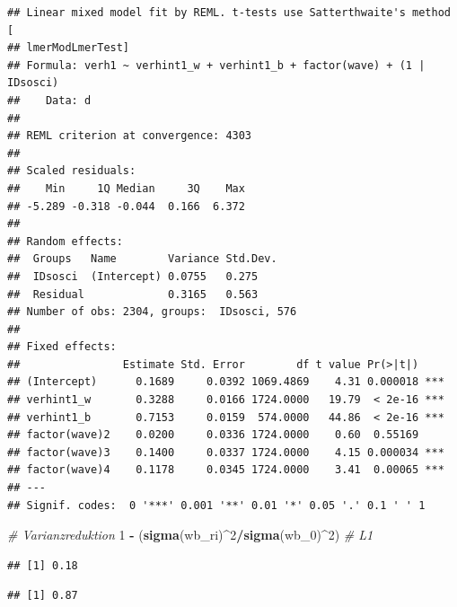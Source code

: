 \documentclass[
]{book}
\newenvironment{Shaded}{\begin{snugshade}}{\end{snugshade}}
\newcommand{\CommentTok}[1]{\textcolor[rgb]{0.56,0.35,0.01}{\textit{#1}}}
\newcommand{\DecValTok}[1]{\textcolor[rgb]{0.00,0.00,0.81}{#1}}
\newcommand{\KeywordTok}[1]{\textcolor[rgb]{0.13,0.29,0.53}{\textbf{#1}}}
\newcommand{\NormalTok}[1]{#1}
\newcommand{\OperatorTok}[1]{\textcolor[rgb]{0.81,0.36,0.00}{\textbf{#1}}}
\newcommand{\StringTok}[1]{\textcolor[rgb]{0.31,0.60,0.02}{#1}}
\begin{document}
\begin{verbatim}
## Linear mixed model fit by REML. t-tests use Satterthwaite's method [
## lmerModLmerTest]
## Formula: verh1 ~ verhint1_w + verhint1_b + factor(wave) + (1 | IDsosci)
##    Data: d
## 
## REML criterion at convergence: 4303
## 
## Scaled residuals: 
##    Min     1Q Median     3Q    Max 
## -5.289 -0.318 -0.044  0.166  6.372 
## 
## Random effects:
##  Groups   Name        Variance Std.Dev.
##  IDsosci  (Intercept) 0.0755   0.275   
##  Residual             0.3165   0.563   
## Number of obs: 2304, groups:  IDsosci, 576
## 
## Fixed effects:
##                Estimate Std. Error        df t value Pr(>|t|)    
## (Intercept)      0.1689     0.0392 1069.4869    4.31 0.000018 ***
## verhint1_w       0.3288     0.0166 1724.0000   19.79  < 2e-16 ***
## verhint1_b       0.7153     0.0159  574.0000   44.86  < 2e-16 ***
## factor(wave)2    0.0200     0.0336 1724.0000    0.60  0.55169    
## factor(wave)3    0.1400     0.0337 1724.0000    4.15 0.000034 ***
## factor(wave)4    0.1178     0.0345 1724.0000    3.41  0.00065 ***
## ---
## Signif. codes:  0 '***' 0.001 '**' 0.01 '*' 0.05 '.' 0.1 ' ' 1
\end{verbatim}

\begin{Shaded}
\begin{Highlighting}[]
\CommentTok{# Varianzreduktion}
\DecValTok{1} \OperatorTok{-}\StringTok{ }\NormalTok{(}\KeywordTok{sigma}\NormalTok{(wb_ri)}\OperatorTok{^}\DecValTok{2}\OperatorTok{/}\KeywordTok{sigma}\NormalTok{(wb_}\DecValTok{0}\NormalTok{)}\OperatorTok{^}\DecValTok{2}\NormalTok{)  }\CommentTok{# L1}
\end{Highlighting}
\end{Shaded}

\begin{verbatim}
## [1] 0.18
\end{verbatim}

\begin{Shaded}
\end{Shaded}

\begin{verbatim}
## [1] 0.87
\end{verbatim}
\end{document}
